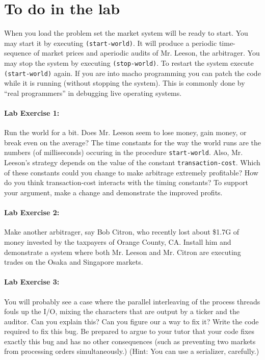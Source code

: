 \section{To do in the lab}

When you load the problem set the market system will be ready to
start.  You may start it by executing {\tt (start-world)}.  It will
produce a periodic time-sequence of market prices and aperiodic audits
of Mr. Leeson, the arbitrager.  You may stop the system by executing
{\tt (stop-world)}.  To restart the system execute {\tt (start-world)}
again.  If you are into macho programming you can patch the code while
it is running (without stopping the system).  This is commonly done by
``real programmers'' in debugging live operating systems.

\paragraph{Lab Exercise 1:}
Run the world for a bit.  Does Mr. Leeson seem to lose money, gain
money, or break even on the average?  The time constants for the way
the world runs are the numbers (of milliseconds) occuring in the
procedure {\tt start-world}.  Also, Mr. Leeson's strategy depends on
the value of the constant {\tt transaction-cost}.  Which of these
constants could you change to make arbitrage extremely profitable?
How do you think transaction-cost interacts with the timing constants?
To support your argument, make a change and demonstrate the improved
profits.

\paragraph{Lab Exercise 2:}
Make another arbitrager, say Bob Citron, who recently lost about
\$1.7G of money invested by the taxpayers of Orange County, CA.
Install him and demonstrate a system where both Mr. Leeson and Mr.
Citron are executing trades on the Osaka and Singapore markets.

\paragraph{Lab Exercise 3:} You will probably see a case where the
parallel interleaving of the process threads fouls up the I/O, mixing
the characters that are output by a ticker and the auditor.  Can you
explain this?  Can you figure our a way to fix it?  Write the code
required to fix this bug.  Be prepared to argue to your tutor that
your code fixes exactly this bug and has no other consequences (such
as preventing two markets from processing orders simultaneously.)
(Hint: You can use a serializer, carefully.)


